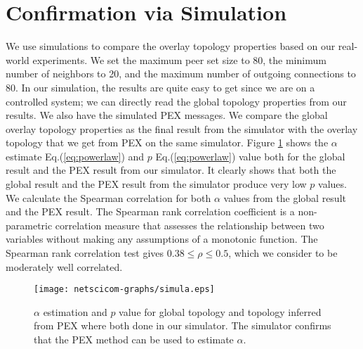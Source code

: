 \documentclass[paper]{ieice}
\begin{document}
\section{Confirmation via Simulation}\label{simulation}
We use simulations to compare the overlay topology properties based  on our real-world experiments. 
We set the maximum peer set size to 80, the minimum number of neighbors to 20, and the maximum number of outgoing connections to 80. 
In our simulation, the results are quite easy to get since we are on a controlled system;  we can directly read the  global topology properties from our results. 
We also have the simulated PEX messages. We compare the global overlay topology properties as the final result from the simulator with the overlay topology that we get from PEX on the same simulator.
Figure \ref{fig:simulation} shows the $\alpha$ estimate Eq.(\ref{eq:powerlaw}) and $p$ Eq.(\ref{eq:powerlaw}) value both for the global result and the PEX result from our simulator. 
It clearly shows that both the global result and the PEX result from the simulator produce very low $p$ values. 
We calculate the Spearman correlation for both $\alpha$ values from the global result and the PEX result. 
The Spearman rank correlation coefficient is a non-parametric correlation measure that assesses the relationship between two variables
without making any assumptions of a monotonic function.
The Spearman rank correlation test gives $0.38 \leq \rho \leq 0.5$, which we consider to be moderately well correlated. 

\begin{figure}[!tb]
\begin{center}
\texttt{[image: netscicom-graphs/simula.eps]}
\end{center}
\caption{$\alpha$ estimation and $p$ value for global topology and topology inferred from PEX where both done in our simulator.
The simulator confirms that the PEX method can be used to estimate $\alpha$.} 
\label{fig:simulation}
\vspace{-5mm}
\end{figure}
\end{document}
